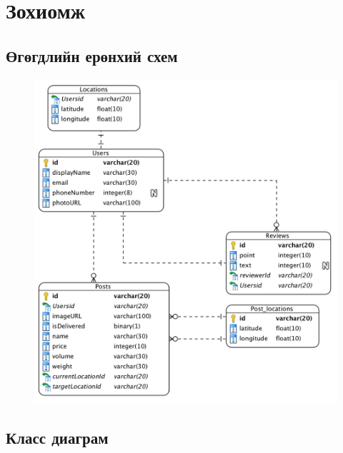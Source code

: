 
\pagecolor{ChapterYellow}
\chapter{Зохиомж} %
\label{Chapter3} %


\pagecolor{white}
\section{Өгөгдлийн ерөнхий схем}

\begin{figure}[H]
    \centering
    \includegraphics[width=\textwidth]{Figures/zohiomj/erd.png}
\end{figure}

\section{Класс диаграм}

